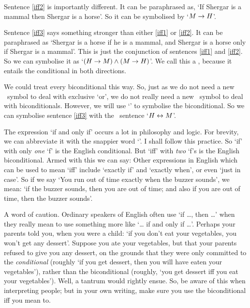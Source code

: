Sentence \ref{iff2} is importantly different. It can be paraphrased as, `If Shergar is a mammal then Shergar is a horse'. So it can be symbolised by `$M\rightarrow H$'.

Sentence \ref{iff3} says something stronger than either \ref{iff1} or \ref{iff2}. It can be paraphrased as `Shergar is a horse if he is a mammal, and Shergar is a horse only if Shergar is a mammal'. This is just the conjunction of sentences \ref{iff1} and \ref{iff2}. So we can symbolise it as `$(H \rightarrow M) \wedge (M \rightarrow H)$'. We call this a , because it entails the conditional in both directions. 

We could treat every biconditional this way. So, just as we do not need a new \TFL\ symbol to deal with exclusive `or', we do not really need a new \TFL\ symbol to deal with biconditionals. However, we will use `\eiff' to symbolise the biconditional. So we can symbolise sentence \ref{iff3} with the \TFL\ sentence `$H \leftrightarrow M$'. 

The expression `if and only if' occurs a lot in philosophy and logic. For brevity, we can abbreviate it with the snappier word `'. I shall follow this practice. So `if' with only \emph{one} `f' is the English conditional. But `iff' with \emph{two} `f's is the English biconditional. Armed with this we can say:
Other expressions in English which can be used to mean `iff' include `exactly if' and `exactly when', or even `just in case'. So if we say `You run out of time exactly when the buzzer sounds', we mean: `if the buzzer sounds, then you are out of time; and also if you are out of time, then the buzzer sounds'. %

A word of caution. Ordinary speakers of English often use `if …, then …' when they really mean to use something more like `… if and only if …'. Perhaps your parents told you, when you were a child: `if you don't eat your vegetables, you won't get any dessert'. Suppose you ate your vegetables, but that your parents refused to give you any dessert, on the grounds that they were only committed to the \emph{conditional} (roughly `if you get dessert, then you will have eaten your vegetables'), rather than the biconditional (roughly, `you get dessert iff you eat your vegetables'). Well, a tantrum would rightly ensue. So, be aware of this when interpreting people; but in your own writing, make sure you use the biconditional iff you mean to.


